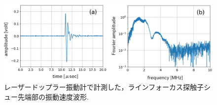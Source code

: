 \begin{figure}[h]
	\begin{center}
	\includegraphics[width=0.9\linewidth]{Figs/fig5.eps} 
	\end{center}
	\caption{
		レーザードップラー振動計で計測した，ラインフォーカス探触子シュー先端部の振動速度波形.
	} 
	\label{fig:fig5}
\end{figure}
